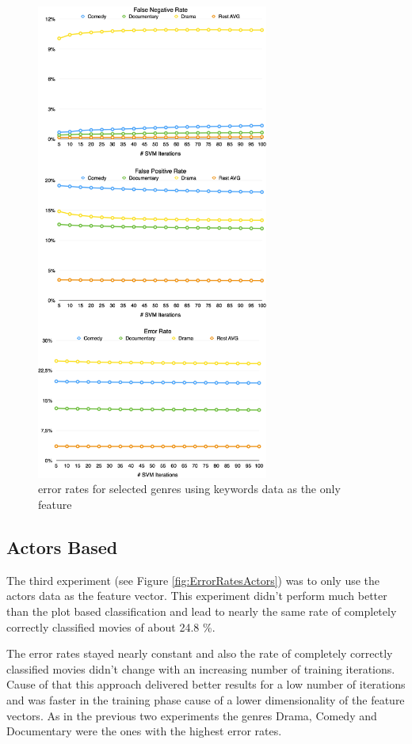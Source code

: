 \documentclass{vldb}
\begin{document}
\begin{figure}
\begin{center}
\includegraphics[width=3.00in]{ErrorRatesKeywords.png}
\caption{error rates for selected genres using keywords data as the only feature}
\label{fig:ErrorRatesKeywords}
\end{center}
\end{figure}

\subsection{Actors Based}
\par The third experiment (see Figure \ref{fig:ErrorRatesActors})  was to only use the actors data as the feature vector. This experiment didn't perform much better than the plot based classification and lead to nearly the same rate of completely correctly classified movies of about 24.8 \%.
\par The error rates stayed nearly constant and also the rate of completely correctly classified movies didn't change with an increasing number of training iterations. Cause of that this approach delivered better results for a low number of iterations and was faster in the training phase cause of a lower dimensionality of the feature vectors.
As in the previous two experiments the genres Drama, Comedy and Documentary were the ones with the highest error rates.
\end{document}
